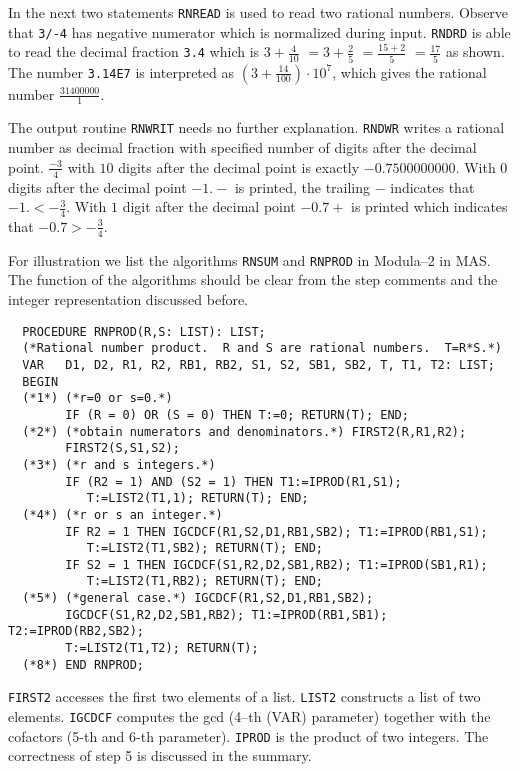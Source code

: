 In the next two statements \verb/RNREAD/ is used to 
read two rational numbers. Observe that \verb"3/-4" 
has negative numerator which is normalized during input.
\verb/RNDRD/ is able to read the decimal fraction
\verb/3.4/ which is $3 + \frac{4}{10}$
$= 3 + \frac{2}{5}$ $= \frac{15 + 2}{5}$ $=\frac{17}{5}$
as shown.
The number \verb/3.14E7/ is interpreted as 
$(3 + \frac{14}{100}) \cdot 10^7$, which gives the
rational number $\frac{31400000}{1}$. 

The output routine \verb/RNWRIT/ needs no further 
explanation. 
\verb/RNDWR/ writes a rational number as decimal fraction
with specified number of digits after the decimal point.
$\frac{-3}{4}$ with $10$ digits after the decimal point 
is exactly $-0.7500000000$.
With $0$ digits after the decimal point $-1.-$ is printed,
the trailing $-$ indicates that $-1. < - \frac{3}{4}$.
With $1$ digit after the decimal point $-0.7+$ is printed
which indicates that $-0.7 > - \frac{3}{4}$.

For illustration we list 
the algorithms \verb/RNSUM/ and \verb/RNPROD/ in Modula--2
in MAS.
The function of the algorithms should be clear from the 
step comments and the integer representation 
discussed before.

{\footnotesize
\begin{verbatim}
  PROCEDURE RNPROD(R,S: LIST): LIST;
  (*Rational number product.  R and S are rational numbers.  T=R*S.*)
  VAR   D1, D2, R1, R2, RB1, RB2, S1, S2, SB1, SB2, T, T1, T2: LIST;
  BEGIN
  (*1*) (*r=0 or s=0.*)
        IF (R = 0) OR (S = 0) THEN T:=0; RETURN(T); END;
  (*2*) (*obtain numerators and denominators.*) FIRST2(R,R1,R2);
        FIRST2(S,S1,S2);
  (*3*) (*r and s integers.*)
        IF (R2 = 1) AND (S2 = 1) THEN T1:=IPROD(R1,S1);
           T:=LIST2(T1,1); RETURN(T); END;
  (*4*) (*r or s an integer.*)
        IF R2 = 1 THEN IGCDCF(R1,S2,D1,RB1,SB2); T1:=IPROD(RB1,S1);
           T:=LIST2(T1,SB2); RETURN(T); END;
        IF S2 = 1 THEN IGCDCF(S1,R2,D2,SB1,RB2); T1:=IPROD(SB1,R1);
           T:=LIST2(T1,RB2); RETURN(T); END;
  (*5*) (*general case.*) IGCDCF(R1,S2,D1,RB1,SB2);
        IGCDCF(S1,R2,D2,SB1,RB2); T1:=IPROD(RB1,SB1); T2:=IPROD(RB2,SB2);
        T:=LIST2(T1,T2); RETURN(T);
  (*8*) END RNPROD;
\end{verbatim}
}
\verb/FIRST2/ accesses the first two elements of a list.
\verb/LIST2/ constructs a list of two elements.
\verb/IGCDCF/ computes the gcd (4--th (VAR) parameter)  
together with the cofactors (5-th and 6-th parameter).
\verb/IPROD/ is the product of two integers.
The correctness of step 5 is discussed in the summary.

